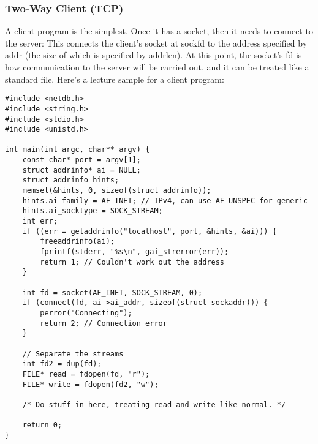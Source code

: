 \documentclass{article}
\begin{document}
\subsubsection{Two-Way Client (TCP)}
A client program is the simplest. Once it has a socket, then it needs to connect to the server:
This connects the client's socket at sockfd to the address specified by addr (the size of which is specified by addrlen). At this point, the socket's fd is how communication to the server will be carried out, and it can be treated like a standard file. Here's a lecture sample for a client program:
\begin{verbatim}
#include <netdb.h>
#include <string.h>
#include <stdio.h>
#include <unistd.h>

int main(int argc, char** argv) {
    const char* port = argv[1];
    struct addrinfo* ai = NULL;
    struct addrinfo hints;
    memset(&hints, 0, sizeof(struct addrinfo));
    hints.ai_family = AF_INET; // IPv4, can use AF_UNSPEC for generic
    hints.ai_socktype = SOCK_STREAM;
    int err;
    if ((err = getaddrinfo("localhost", port, &hints, &ai))) {
        freeaddrinfo(ai);
        fprintf(stderr, "%s\n", gai_strerror(err));
        return 1; // Couldn't work out the address
    }

    int fd = socket(AF_INET, SOCK_STREAM, 0);
    if (connect(fd, ai->ai_addr, sizeof(struct sockaddr))) {
        perror("Connecting");
        return 2; // Connection error
    }

    // Separate the streams
    int fd2 = dup(fd);
    FILE* read = fdopen(fd, "r");
    FILE* write = fdopen(fd2, "w");

    /* Do stuff in here, treating read and write like normal. */

    return 0;
}
\end{verbatim}
\end{document}
